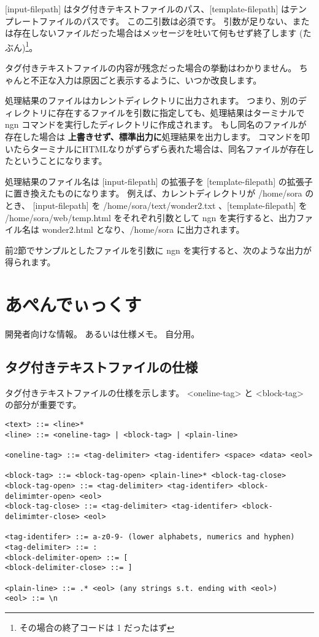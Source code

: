 \documentclass[a4j]{jsarticle}
\begin{document}
[input-filepath] はタグ付きテキストファイルのパス、[template-filepath] はテンプレートファイルのパスです。
この二引数は必須です。
引数が足りない、または存在しないファイルだった場合はメッセージを吐いて何もせず終了します (たぶん)\footnote{その場合の終了コードは 1 だったはず}。

タグ付きテキストファイルの内容が残念だった場合の挙動はわかりません。
ちゃんと不正な入力は原因ごと表示するように、いつか改良します。

処理結果のファイルはカレントディレクトリに出力されます。
つまり、別のディレクトリに存在するファイルを引数に指定しても、処理結果はターミナルで ngn コマンドを実行したディレクトリに作成されます。
もし同名のファイルが存在した場合は \textbf{上書きせず、標準出力に}処理結果を出力します。
コマンドを叩いたらターミナルにHTMLなりがずらずら表れた場合は、同名ファイルが存在したということになります。

処理結果のファイル名は [input-filepath] の拡張子を [template-filepath] の拡張子に置き換えたものになります。
例えば、カレントディレクトリが /home/sora のとき、 [input-filepath] を /home/sora/text/wonder2.txt 、[template-filepath] を /home/sora/web/temp.html をそれぞれ引数として ngn を実行すると、出力ファイル名は wonder2.html となり、/home/sora に出力されます。

前2節でサンプルとしたファイルを引数に ngn を実行すると、次のような出力が得られます。




\section{あぺんでぃっくす}
開発者向けな情報。
あるいは仕様メモ。
自分用。


\subsection{タグ付きテキストファイルの仕様}

タグ付きテキストファイルの仕様を示します。
<oneline-tag> と <block-tag> の部分が重要です。

\begin{lstlisting}[caption=タグ付きテキストファイル]
<text> ::= <line>*
<line> ::= <oneline-tag> | <block-tag> | <plain-line>

<oneline-tag> ::= <tag-delimiter> <tag-identifer> <space> <data> <eol>

<block-tag> ::= <block-tag-open> <plain-line>* <block-tag-close>
<block-tag-open> ::= <tag-delimiter> <tag-identifer> <block-delimimter-open> <eol>
<block-tag-close> ::= <tag-delimiter> <tag-identifer> <block-delimimter-close> <eol>
  
<tag-identifer> ::= a-z0-9- (lower alphabets, numerics and hyphen)  
<tag-delimiter> ::= :
<block-delimiter-open> ::= [
<block-delimiter-close> ::= ]

<plain-line> ::= .* <eol> (any strings s.t. ending with <eol>)  
<eol> ::= \n
\end{lstlisting}
\end{document}
